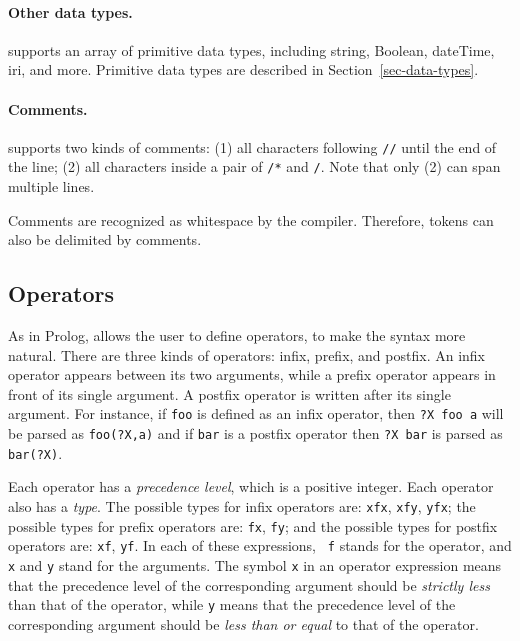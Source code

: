 \documentclass[11pt]{article}
\newcommand{\ERGO}{\mbox{\smaller{\ensuremath{\cal{E}}\smaller{{\sc{RGO}}}}}\xspace}
\newcommand{\FLSYSTEM}{\ERGO}
\begin{document}
\paragraph{Other data types.}
\FLSYSTEM supports an array of primitive data types, including string, Boolean,
dateTime, iri, and more. Primitive data types are described in
Section~\ref{sec-data-types}.

\paragraph{Comments.}

%
\FLSYSTEM supports two kinds of comments: (1) all characters following
{\tt //} until the end of the line; (2) all characters inside a pair of
{\tt /*} and {\tt */}. Note that only (2) can span multiple lines.

Comments are recognized as whitespace by the compiler.  Therefore,
tokens can also be delimited by comments.


\subsection{Operators}


As in Prolog, \FLSYSTEM allows the user to define operators, to make the
syntax more natural.
There are three kinds of operators: infix,
prefix, and postfix. An infix operator appears between its two arguments,
while a prefix operator appears in front of its single argument. A postfix
operator is written
after its single argument. For instance, if {\tt foo} is defined as an
infix operator, then {\tt ?X foo a} will be parsed as {\tt foo(?X,a)} and if
{\tt bar} is a postfix operator then {\tt ?X bar} is parsed as {\tt bar(?X)}. 

%
Each operator has a \emph{precedence level}, which is a positive integer.
Each operator also has a \emph{type}. The possible types for infix operators
are: {\tt xfx}, {\tt xfy}, {\tt yfx}; the possible types for prefix
operators are: {\tt fx}, {\tt fy}; and the possible types for postfix
operators are: {\tt xf}, {\tt yf}. In each of these expressions, {\tt
  f} stands for the operator, and {\tt x} and {\tt y} stand for the
arguments.  The symbol {\tt x} in an operator expression means that the
precedence level of the corresponding argument should be \emph{strictly
  less} than that of the operator, while {\tt y} means that the precedence
level of the corresponding argument should be \emph{less than or equal} to
that of the operator.
\end{document}
